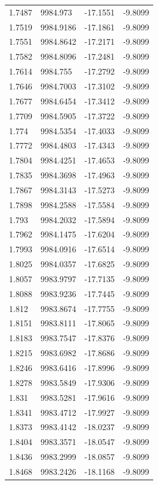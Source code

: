 \begin{table}[H]
\begin{tabular}{llll}
1.7487 & 9984.973 & -17.1551 & -9.8099 \\
1.7519 & 9984.9186 & -17.1861 & -9.8099 \\
1.7551 & 9984.8642 & -17.2171 & -9.8099 \\
1.7582 & 9984.8096 & -17.2481 & -9.8099 \\
1.7614 & 9984.755 & -17.2792 & -9.8099 \\
1.7646 & 9984.7003 & -17.3102 & -9.8099 \\
1.7677 & 9984.6454 & -17.3412 & -9.8099 \\
1.7709 & 9984.5905 & -17.3722 & -9.8099 \\
1.774 & 9984.5354 & -17.4033 & -9.8099 \\
1.7772 & 9984.4803 & -17.4343 & -9.8099 \\
1.7804 & 9984.4251 & -17.4653 & -9.8099 \\
1.7835 & 9984.3698 & -17.4963 & -9.8099 \\
1.7867 & 9984.3143 & -17.5273 & -9.8099 \\
1.7898 & 9984.2588 & -17.5584 & -9.8099 \\
1.793 & 9984.2032 & -17.5894 & -9.8099 \\
1.7962 & 9984.1475 & -17.6204 & -9.8099 \\
1.7993 & 9984.0916 & -17.6514 & -9.8099 \\
1.8025 & 9984.0357 & -17.6825 & -9.8099 \\
1.8057 & 9983.9797 & -17.7135 & -9.8099 \\
1.8088 & 9983.9236 & -17.7445 & -9.8099 \\
1.812 & 9983.8674 & -17.7755 & -9.8099 \\
1.8151 & 9983.8111 & -17.8065 & -9.8099 \\
1.8183 & 9983.7547 & -17.8376 & -9.8099 \\
1.8215 & 9983.6982 & -17.8686 & -9.8099 \\
1.8246 & 9983.6416 & -17.8996 & -9.8099 \\
1.8278 & 9983.5849 & -17.9306 & -9.8099 \\
1.831 & 9983.5281 & -17.9616 & -9.8099 \\
1.8341 & 9983.4712 & -17.9927 & -9.8099 \\
1.8373 & 9983.4142 & -18.0237 & -9.8099 \\
1.8404 & 9983.3571 & -18.0547 & -9.8099 \\
1.8436 & 9983.2999 & -18.0857 & -9.8099 \\
1.8468 & 9983.2426 & -18.1168 & -9.8099 \\

\end{tabular}
\end{table}
